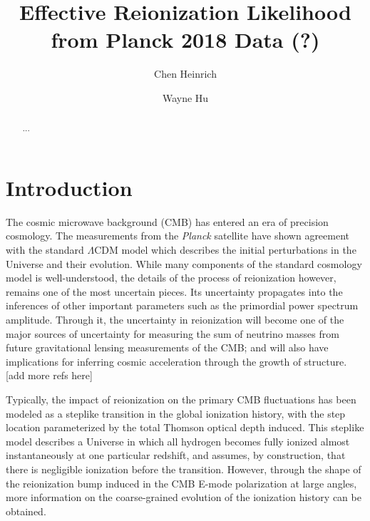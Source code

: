 \documentclass[prd,twocolumn,amsmath,amssymb,floatfix,superscriptaddress,nofootinbib]{revtex4-1}
\begin{document}
	
\title{Effective Reionization Likelihood from Planck 2018 Data (?)}

\author{Chen Heinrich}

\author{Wayne Hu}

\begin{abstract}

...

\end{abstract}
\pacs{}

\maketitle




\section{Introduction}
\label{sec:intro}

The cosmic microwave background (CMB) has entered an era of precision cosmology. The measurements from the \textit{Planck} satellite have shown agreement with the standard $\Lambda$CDM model which describes the initial perturbations in the Universe and their evolution. While many components of the standard cosmology model is well-understood, the details of the process of reionization however, remains one of the most uncertain pieces. Its uncertainty propagates into the inferences of other important parameters such as the primordial power spectrum amplitude. Through it, the uncertainty in reionization will become one of the major sources of uncertainty for measuring the sum of neutrino masses from future gravitational lensing measurements of the CMB; and will also have implications for inferring cosmic acceleration through the growth of structure. [add more refs here]

Typically, the impact of reionization on the primary CMB fluctuations has been modeled as a steplike transition in the global ionization history, with the step location parameterized by the total Thomson optical depth induced. This steplike model describes a Universe in which all hydrogen becomes fully ionized almost instantaneously at one particular redshift, and assumes, by construction, that there is negligible ionization before the transition. However, through the shape of the reionization bump induced in the CMB E-mode polarization at large angles, more information on the coarse-grained evolution of the ionization history can be obtained. 
\end{document}
